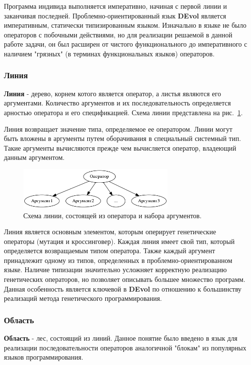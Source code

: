 \documentclass[russian,utf8,emptystyle]{eskdtext}
\begin{document}
\begin{spacing}{1.5}
Программа индивида выполняется императивно, начиная с первой линии и заканчивая последней. Проблемно-ориентированный язык \textbf{DEvol} является императивным, статически типизированным языком. Изначально в языке не было операторов с побочными действиями, но для реализации решаемой в данной работе задачи, он был расширен от чистого функционального до императивного с наличием "грязных" (в терминах функциональных языков) операторов.

\subsubsection{Линия}
\textbf{Линия} - дерево, корнем котого является оператор, а листья являются его аргументами. Количество аргументов и их последовательность определяется арностью оператора и его спецификацией. Схема линии представлена на рис.~\ref{fig:line-example}. 

Линия возвращает значение типа, определяемое ее оператором. Линии могут быть вложены в аргументы путем оборачивания в специальный системный тип.  Такие аргументы вычисляются прежде чем вычисляется оператор, владеющий данным аргументом.

\begin{figure}[h!]
\centering
\includegraphics[width=0.7\textwidth]{line-example.png}
\caption{Схема линии, состоящей из оператора и набора аргументов.}
\label{fig:line-example}
\end{figure}

Линия является основным элементом, которым оперирует генетические операторы (мутация и кроссинговер). Каждая линия имеет свой тип, который определяется возвращаемым типом оператора. Также каждый аргумент принадлежит одному из типов, определенных в проблемно-ориентированном языке. Наличие типизации значительно усложняет корректную реализацию генетических операторов, но позволяет описывать большее множество программ. Данная особенность является ключевой в \textbf{DEvol} по отношению к большинству реализаций метода генетического программирования.

\subsubsection{Область}
\textbf{Область} - лес, состоящий из линий. Данное понятие было введено в язык для реализации последовательности операторов аналогичной "блокам" из популярных языков программирования. 


\end{spacing}
\end{document}
